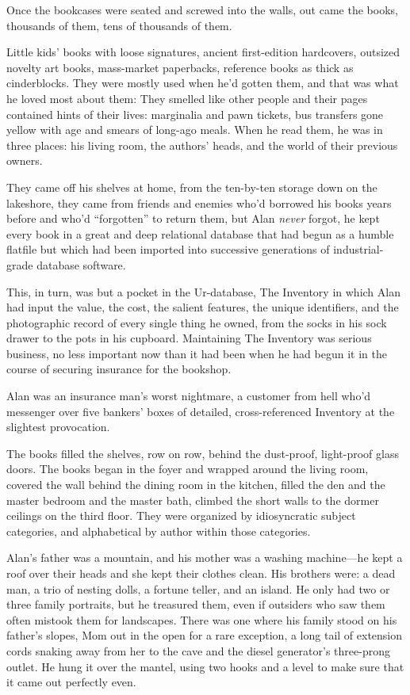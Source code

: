 Once the bookcases were seated and screwed into the walls, out came
the books, thousands of them, tens of thousands of them.

Little kids' books with loose signatures, ancient first-edition
hardcovers, outsized novelty art books, mass-market paperbacks,
reference books as thick as cinderblocks.  They were mostly used when
he'd gotten them, and that was what he loved most about them:  They
smelled like other people and their pages contained hints of their
lives:  marginalia and pawn tickets, bus transfers gone yellow with
age and smears of long-ago meals.  When he read them, he was in three
places:  his living room, the authors' heads, and the world of their
previous owners.

They came off his shelves at home, from the ten-by-ten storage down on
the lakeshore, they came from friends and enemies who'd borrowed his
books years before and who'd ``forgotten'' to return them, but Alan
\textit{never} forgot, he kept every book in a great and deep
relational database that had begun as a humble flatfile but which had
been imported into successive generations of industrial-grade database
software.

This, in turn, was but a pocket in the Ur-database, The Inventory in
which Alan had input the value, the cost, the salient features, the
unique identifiers, and the photographic record of every single thing
he owned, from the socks in his sock drawer to the pots in his
cupboard.  Maintaining The Inventory was serious business, no less
important now than it had been when he had begun it in the course of
securing insurance for the bookshop.

Alan was an insurance man's worst nightmare, a customer from hell
who'd messenger over five bankers' boxes of detailed, cross-referenced
Inventory at the slightest provocation.

The books filled the shelves, row on row, behind the dust-proof,
light-proof glass doors.  The books began in the foyer and wrapped
around the living room, covered the wall behind the dining room in the
kitchen, filled the den and the master bedroom and the master bath,
climbed the short walls to the dormer ceilings on the third floor. 
They were organized by idiosyncratic subject categories, and
alphabetical by author within those categories.

Alan's father was a mountain, and his mother was a washing
machine---he kept a roof over their heads and she kept their clothes
clean.  His brothers were:  a dead man, a trio of nesting dolls, a
fortune teller, and an island.  He only had two or three family
portraits, but he treasured them, even if outsiders who saw them often
mistook them for landscapes.  There was one where his family stood on
his father's slopes, Mom out in the open for a rare exception, a long
tail of extension cords snaking away from her to the cave and the
diesel generator's three-prong outlet.  He hung it over the mantel,
using two hooks and a level to make sure that it came out perfectly
even.

